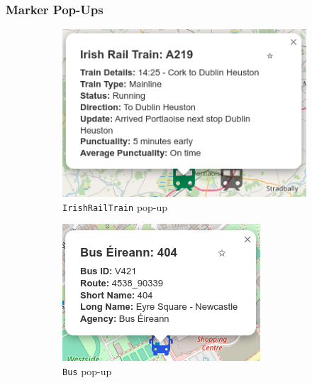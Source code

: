 \documentclass[a4paper,11pt]{report}
\begin{document}
\subsubsection{Marker Pop-Ups}
\begin{figure}[H]
    \centering
    \begin{subfigure}[c]{0.3\textwidth}
        \centering
        \includegraphics[width=\textwidth]{./images/irishrailtrainpopup.png}
        \caption{\texttt{IrishRailTrain} pop-up}
    \end{subfigure}
    \hfill
    \begin{subfigure}[c]{0.3\textwidth}
        \centering
        \includegraphics[width=\textwidth]{./images/buspopup.png}
        \caption{\texttt{Bus} pop-up}
    \end{subfigure}
    \hfill
    \begin{subfigure}[c]{0.3\textwidth}

\end{subfigure}
\end{figure}
\end{document}
